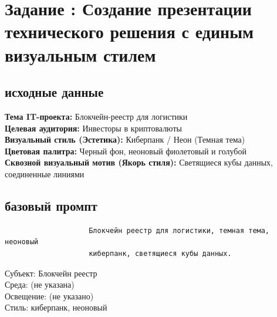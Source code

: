 \newpage %
\section*{Задание \thesection : Создание презентации технического решения с единым визуальным стилем}
\subsection{исходные данные}
\indent \textbf{Тема IT-проекта:} Блокчейн-реестр для логистики \\
\indent \textbf{Целевая аудитория:} Инвесторы в криптовалюты \\
\indent \textbf{Визуальный стиль (Эстетика):} Киберпанк / Неон (Темная тема) \\
\indent \textbf{Цветовая палитра:} Черный фон, неоновый фиолетовый и голубой \\
\indent \textbf{Сквозной визуальный мотив (Якорь стиля):} Светящиеся кубы данных, соединенные линиями
\subsection{базовый промпт}
\begin{verbatim}
					Блокчейн реестр для логистики, темная тема, неоновый
					киберпанк, светящиеся кубы данных.
\end{verbatim}
Субъект: Блокчейн реестр\\
Среда: (не указана)\\
Освещение: (не указано)\\
Стиль: киберпанк, неоновый
